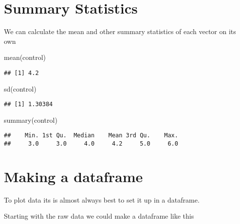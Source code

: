 \documentclass[
]{book}
\newenvironment{Shaded}{\begin{snugshade}}{\end{snugshade}}
\newcommand{\FunctionTok}[1]{\textcolor[rgb]{0.00,0.00,0.00}{#1}}
\newcommand{\NormalTok}[1]{#1}
\begin{document}
\hypertarget{summary-statistics-1}{%
\section{Summary Statistics}\label{summary-statistics-1}}

We can calculate the mean and other summary statistics of each vector on its own

\begin{Shaded}
\begin{Highlighting}[]
\FunctionTok{mean}\NormalTok{(control)}
\end{Highlighting}
\end{Shaded}

\begin{verbatim}
## [1] 4.2
\end{verbatim}

\begin{Shaded}
\begin{Highlighting}[]
\FunctionTok{sd}\NormalTok{(control)}
\end{Highlighting}
\end{Shaded}

\begin{verbatim}
## [1] 1.30384
\end{verbatim}

\begin{Shaded}
\begin{Highlighting}[]
\FunctionTok{summary}\NormalTok{(control)}
\end{Highlighting}
\end{Shaded}

\begin{verbatim}
##    Min. 1st Qu.  Median    Mean 3rd Qu.    Max. 
##     3.0     3.0     4.0     4.2     5.0     6.0
\end{verbatim}

\hypertarget{making-a-dataframe-1}{%
\section{Making a dataframe}\label{making-a-dataframe-1}}

To plot data its is almost always best to set it up in a dataframe.

Starting with the raw data we could make a dataframe like this
\end{document}
